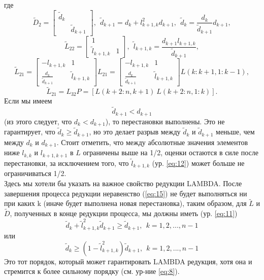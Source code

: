 \documentclass[12pt]{matmex-diploma}
\begin{document}
где 
\begin{equation}
     \tilde{D}_2 = 
     \begin{bmatrix}
     \tilde{d}_k &  \\
     & \tilde{d}_{k+1}
     \end{bmatrix}, \ \
     \tilde{d}_{k+1} = d_k + l^2_{k+1,k}d_{k+1}, \ \
     \tilde{d}_{k} = \frac{d_k}{\tilde{d}_{k+1}}d_{k+1},
     \label{eq:11}
\end{equation}
\begin{equation}
     \tilde{L}_{22} = 
     \begin{bmatrix}
     1 &  \\
     \tilde{l}_{k+1,k} & 1
     \end{bmatrix}, \ \
     \tilde{l}_{k+1,k} = \frac{d_{k+1}l_{k+1,k}}{\tilde{d}_{k+1}},
     \label{eq:12}
\end{equation}
\begin{equation}
     \tilde{L}_{21} = 
     \begin{bmatrix}
     -l_{k+1,k} & 1 \\
      \frac{d_k}{\tilde{d}_{k+1}}& \tilde{l}_{k+1,k}
     \end{bmatrix}L_{21} =
     \begin{bmatrix}
     -l_{k+1,k} & 1 \\
      \frac{d_k}{\tilde{d}_{k+1}}& \tilde{l}_{k+1,k}
     \end{bmatrix}L(k:k+1,1:k-1),
     \label{eq:13}
\end{equation}
\begin{equation}
     \tilde{L}_{21} = L_{32}P = 
     [L(k+2:n,k+1) \ L(k+2:n,1:k)].
     \label{eq:14}
\end{equation}
Если мы имеем
\begin{equation}
    \tilde{d}_{k+1} < d_{k+1}
    \label{eq:15}
\end{equation}
(из этого следует, что $d_{k} < d_{k+1}$), то перестановки выполнены. Это не 
гарантирует, что $\tilde{d}_{k} \geq \tilde{d}_{k+1}$, но это делает разрыв между
$\tilde{d}_{k}$ и $\tilde{d}_{k+1}$ меньше, чем между $d_{k}$ и $d_{k+1}$. 
Стоит отметить, что между абсолютные значения элементов ниже $l_{k,k}$ и $l_{k+1,k+1}$
в $L$ ограничены выше на 1/2, оценки остаются в силе после перестановки,
за исключением того, что $\tilde{l}_{k+1,k}$ (ур. \ref{eq:12}) может
больше не ограничиваться 1/2. \\ 
Здесь мы хотели бы указать на важное свойство редукции LAMBDA. После завершения
процесса редукции неравенство (\ref{eq:15}) не будет выполняться ни при каких k 
(иначе будет выполнена новая перестановка), таким образом, для $\tilde{L}$ и
$\tilde{D}$, полученных в конце редукции процесса, мы должны иметь (ур. \ref{eq:11})
\begin{equation*}
     \tilde{d}_{k} + \tilde{l}^2_{k+1,k}\tilde{d}_{k+1} \geq \tilde{d}_{k+1}, \ \
     k = 1,2,...,n-1
\end{equation*}
или
\begin{equation}
     \tilde{d}_{k} \geq (1 - \tilde{l}^2_{k+1,k})\tilde{d}_{k+1}, \ \
     k = 1,2,...,n-1
     \label{eq:16}
\end{equation}
Это тот порядок, который может гарантировать LAMBDA редукция, хотя она и
стремится к более сильному порядку (см. ур-ние \ref{eq:8}).
\newpage
\end{document}
